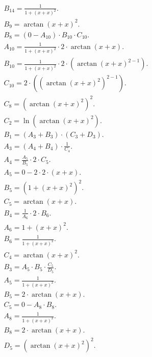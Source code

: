 \documentclass[12pt,a4paper]{extreport}
\begin{document}
\begin{multline}
\\
B_{14} = \frac{1}{1 + (x + x) ^ {2}}.\\
B_{9} = \arctan(x + x) ^ {2}.\\
B_{8} = (0 - A_{10}) \cdot B_{10} \cdot C_{10}.\\
A_{10} = \frac{1}{1 + (x + x) ^ {2}} \cdot 2 \cdot \arctan(x + x).\\
B_{10} = \frac{1}{1 + (x + x) ^ {2}} \cdot 2 \cdot (\arctan(x + x) ^ {2 - 1}).\\
C_{10} = 2 \cdot ((\arctan(x + x) ^ {2}) ^ {2 - 1}).\\
C_{8} = (\arctan(x + x) ^ {2}) ^ {2}.\\
C_{2} = \ln(\arctan(x + x) ^ {2}).\\
B_{1} = (A_{3} + B_{3}) \cdot (C_{3} + D_{3}).\\
A_{3} = (A_{4} + B_{4}) \cdot \frac{1}{C_{4}}.\\
A_{4} = \frac{A_{5}}{B_{5}} \cdot 2 \cdot C_{5}.\\
A_{5} = 0 - 2 \cdot 2 \cdot (x + x).\\
B_{5} = (1 + (x + x) ^ {2}) ^ {2}.\\
C_{5} = \arctan(x + x).\\
B_{4} = \frac{1}{A_{6}} \cdot 2 \cdot B_{6}.\\
A_{6} = 1 + (x + x) ^ {2}.\\
B_{6} = \frac{1}{1 + (x + x) ^ {2}}.\\
C_{4} = \arctan(x + x) ^ {2}.\\
B_{3} = A_{5} \cdot B_{5} \cdot \frac{C_{5}}{D_{5}}.\\
A_{5} = \frac{1}{1 + (x + x) ^ {2}}.\\
B_{5} = 2 \cdot \arctan(x + x).\\
C_{5} = 0 - A_{8} \cdot B_{8}.\\
A_{8} = \frac{1}{1 + (x + x) ^ {2}}.\\
B_{8} = 2 \cdot \arctan(x + x).\\
D_{5} = (\arctan(x + x) ^ {2}) ^ {2}.\\
\end{multline}
\end{document}
